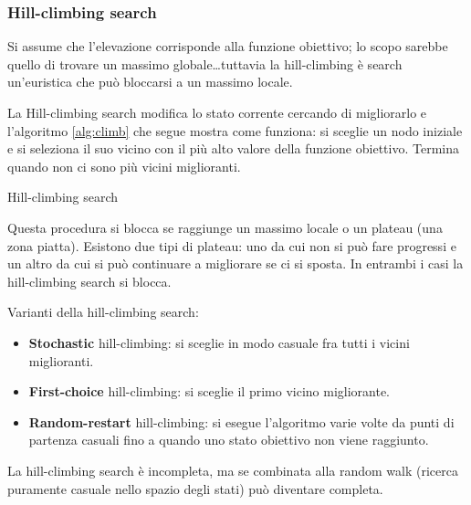 \subsubsection{Hill-climbing search}

Si assume che l'elevazione corrisponde alla funzione obiettivo; lo scopo
sarebbe quello di trovare un massimo globale\dots tuttavia la hill-climbing
è search un'euristica che può bloccarsi a un massimo locale.

La Hill-climbing search modifica lo stato corrente cercando di migliorarlo e
l'algoritmo \ref{alg:climb} che segue mostra come funziona: si sceglie un nodo
iniziale e si seleziona il suo vicino con il più alto valore della funzione
obiettivo. Termina quando non ci sono più vicini miglioranti.

\begin{algorithm}
    \caption{Hill-climbing search}
    \label{alg:climb}
    \begin{algorithmic}[1]
         
            \Loop
              \EndIf
            \EndLoop
        \EndProcedure
    \end{algorithmic}
\end{algorithm}

Questa procedura si blocca se raggiunge un massimo locale o un plateau (una zona
piatta).
Esistono due tipi di plateau: uno da cui non si può fare progressi e un
altro da cui si può continuare a migliorare se ci si sposta. In entrambi i casi
la hill-climbing search si blocca.

Varianti della hill-climbing search:

\begin{itemize}
 \item \textbf{Stochastic} hill-climbing: si sceglie in modo casuale fra
tutti i vicini miglioranti.
 \item \textbf{First-choice} hill-climbing: si sceglie il primo vicino
migliorante.
 \item \textbf{Random-restart} hill-climbing: si esegue l'algoritmo varie volte
da punti di partenza casuali fino a quando uno stato obiettivo non viene
raggiunto.
\end{itemize}

La hill-climbing search è incompleta, ma se combinata alla random walk
(ricerca puramente casuale nello spazio degli stati) può diventare completa.
